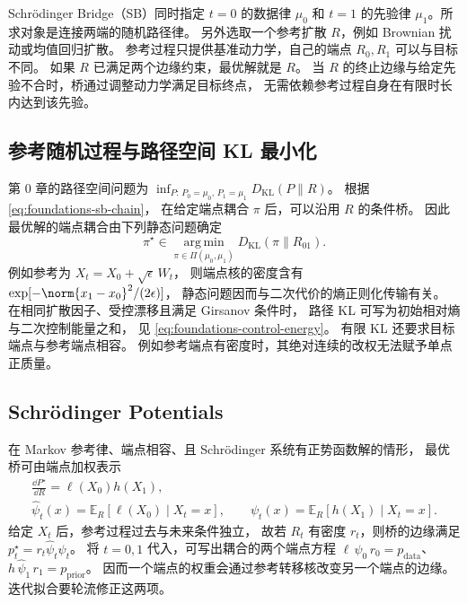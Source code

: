 Schrödinger Bridge（SB）同时指定 \(t=0\) 的数据律 \(\mu_0\) 和
\(t=1\) 的先验律 \(\mu_1\)。所求对象是连接两端的随机路径律。
另外选取一个参考扩散 \(R\)，例如 Brownian 扰动或均值回归扩散。
参考过程只提供基准动力学，自己的端点 \(R_0,R_1\) 可以与目标不同。
如果 \(R\) 已满足两个边缘约束，最优解就是 \(R\)。
当 \(R\) 的终止边缘与给定先验不合时，桥通过调整动力学满足目标终点，
无需依赖参考过程自身在有限时长内达到该先验。

\subsection{参考随机过程与路径空间 KL 最小化}

第 0 章的路径空间问题为
\(\inf_{P:\,P_0=\mu_0,\,P_1=\mu_1}D_{\mathrm{KL}}(P\|R)\)。
根据 \eqref{eq:foundations-sb-chain}，
在给定端点耦合 \(\pi\) 后，可以沿用 \(R\) 的条件桥。
因此最优解的端点耦合由下列静态问题确定
\begin{equation}
  \pi^\star\in\operatorname*{arg\,min}_{\pi\in\Pi(\mu_0,\mu_1)}
      D_{\mathrm{KL}}(\pi\|R_{01}) .
  \label{eq:overview-sb-static}
\end{equation}
例如参考为 \(X_t=X_0+\sqrt{\epsilon}\,W_t\)，
则端点核的密度含有 \(\exp[-\norm{x_1-x_0}^2/(2\epsilon)]\)，
静态问题因而与二次代价的熵正则化传输有关。
在相同扩散因子、受控漂移且满足 Girsanov 条件时，
路径 KL 可写为初始相对熵与二次控制能量之和，
见 \eqref{eq:foundations-control-energy}。
有限 KL 还要求目标端点与参考端点相容。
例如参考端点有密度时，其绝对连续的改权无法赋予单点正质量。

\subsection{Schrödinger Potentials}

在 Markov 参考律、端点相容、且 Schrödinger 系统有正势函数解的情形，
最优桥可由端点加权表示 \cite{leonard2014schrodinger}
\begin{equation}
  \begin{gathered}
  \frac{\dd P^\star}{\dd R}=\ell(X_0)h(X_1),\\
  \widehat\psi_t(x)=\mathbb E_R[\ell(X_0)\mid X_t=x],\qquad
  \psi_t(x)=\mathbb E_R[h(X_1)\mid X_t=x].
  \end{gathered}
  \label{eq:overview-sb-potentials}
\end{equation}
给定 \(X_t\) 后，参考过程过去与未来条件独立，
故若 \(R_t\) 有密度 \(r_t\)，则桥的边缘满足
\(p_t^\star=r_t\widehat\psi_t\psi_t\)。
将 \(t=0,1\) 代入，可写出耦合的两个端点方程
\(\ell\,\psi_0\,r_0=p_{\mathrm{data}}\)、
\(h\,\widehat\psi_1\,r_1=p_{\mathrm{prior}}\)。
因而一个端点的权重会通过参考转移核改变另一个端点的边缘。
迭代拟合要轮流修正这两项。


